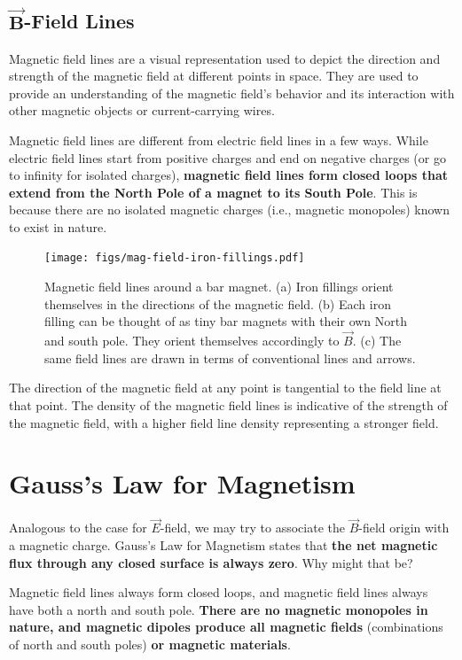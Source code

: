 \documentclass[12pt,b4paper]{article}
\begin{document}
\subsection{$\boldsymbol{\vec{B}}$-Field Lines}
Magnetic field lines are a visual representation used to depict the direction and strength of the magnetic field at different points in space. They are used to provide an understanding of the magnetic field's behavior and its interaction with other magnetic objects or current-carrying wires.

Magnetic field lines are different from electric field lines in a few ways. While electric field lines start from positive charges and end on negative charges (or go to infinity for isolated charges), \textbf{magnetic field lines form closed loops that extend from the North Pole of a magnet to its South Pole}. This is because there are no isolated magnetic charges (i.e., magnetic monopoles) known to exist in nature.
\begin{figure}[H]
    \centering
    \texttt{[image: figs/mag-field-iron-fillings.pdf]}
    \caption{Magnetic field lines around a bar magnet. (a) Iron fillings orient themselves in the directions of the magnetic field. (b) Each iron filling can be thought of as tiny bar magnets with their own North and south pole. They orient themselves accordingly to $\vec{B}$. (c) The same field lines are drawn in terms of conventional lines and arrows.}
    \label{fig:mag-field-filings}
\end{figure}
The direction of the magnetic field at any point is tangential to the field line at that point. The density of the magnetic field lines is indicative of the strength of the magnetic field, with a higher field line density representing a stronger field.
\section{Gauss's Law for Magnetism}
Analogous to the case for $\vec{E}$-field, we may try to associate the $\vec{B}$-field origin with a magnetic charge. Gauss's Law for Magnetism states that \textbf{the net magnetic flux through any closed surface is always zero}. Why might that be?

Magnetic field lines always form closed loops, and magnetic field lines always have both a north and south pole. \textbf{There are no magnetic monopoles in nature, and magnetic dipoles produce all magnetic fields} (combinations of north and south poles) \textbf{or magnetic materials}. 
\end{document}
